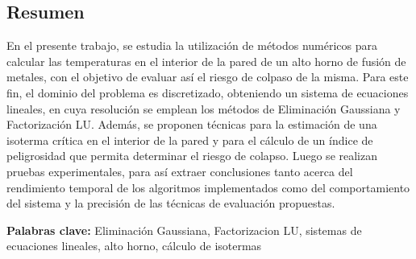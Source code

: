 \documentclass[11pt, a4paper, spanish]{article}
\let\strong\textbf
\theoremstyle{plain}
\theoremstyle{remark}
\theoremstyle{definition}
\begin{document}


\maketitle
\newpage

\begin{addmargin}[4em]{4em}

\section*{\centering Resumen}
  En el presente trabajo, se estudia la utilización de métodos numéricos para calcular las temperaturas en el interior de la pared de un alto horno de fusión de metales, con el objetivo de evaluar así el riesgo de colpaso de la misma. Para este fin, el dominio del problema es discretizado, obteniendo un sistema de ecuaciones lineales, en cuya resolución se emplean los métodos de Eliminación Gaussiana y Factorización LU. Además, se proponen técnicas para la estimación de una isoterma crítica en el interior de la pared y para el cálculo de un índice de peligrosidad que permita determinar el riesgo de colapso. Luego se realizan pruebas experimentales, para así extraer conclusiones tanto acerca del rendimiento temporal de los algoritmos implementados como del comportamiento del sistema y la precisión de las técnicas de evaluación propuestas.

\vspace{4em}
\noindent \strong{Palabras clave:} Eliminación Gaussiana, Factorizacion LU, sistemas de ecuaciones lineales, alto horno, cálculo de isotermas


\end{addmargin}
\clearpage

\tableofcontents
\clearpage


\clearpage

\clearpage

\clearpage

\begin{appendices}
  
  \clearpage
\end{appendices}

\printbibliography[heading=bibintoc]
\end{document}
